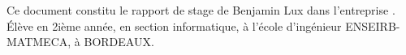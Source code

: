 Ce document constitu le rapport de stage de Benjamin Lux dans
l'entreprise \maxsea. Élève en 2ième année, en section informatique, à
l'école d'ingénieur ENSEIRB-MATMECA, à BORDEAUX.
